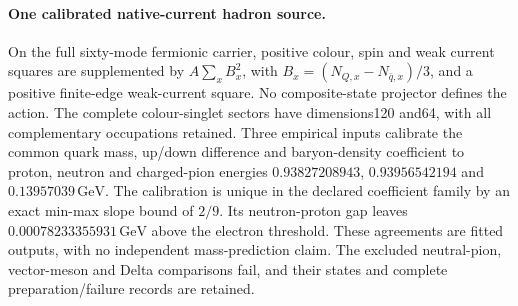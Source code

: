 \paragraph{One calibrated native-current hadron source.}
On the full sixty-mode fermionic carrier, positive colour, spin and weak
current squares are supplemented by $A\sum_x B_x^2$, with
$B_x=(N_{Q,x}-N_{\bar q,x})/3$, and a positive finite-edge weak-current square.
No composite-state projector defines the action. The complete colour-singlet
sectors have dimensions120 and64, with all complementary occupations retained.
Three empirical inputs calibrate the common quark mass, up/down difference
and baryon-density coefficient to proton, neutron and charged-pion energies
$0.93827208943$, $0.93956542194$ and $0.13957039\,\mathrm{GeV}$.
The calibration is unique in the declared coefficient family by an exact
min-max slope bound of $2/9$. Its neutron-proton gap leaves
$0.00078233355931\,\mathrm{GeV}$ above the electron threshold.
These agreements are fitted outputs, with no independent mass-prediction
claim. The excluded neutral-pion, vector-meson and Delta comparisons fail,
and their states and complete preparation/failure records are retained.
